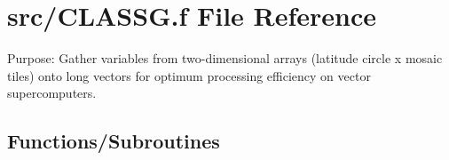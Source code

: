 \hypertarget{CLASSG_8f}{}\section{src/\+C\+L\+A\+S\+S\+G.f File Reference}
\label{CLASSG_8f}


Purpose\+: Gather variables from two-\/dimensional arrays (latitude circle x mosaic tiles) onto long vectors for optimum processing efficiency on vector supercomputers.  


\subsection*{Functions/\+Subroutines}
\begin{DoxyCompactItemize}
\item 

\end{DoxyCompactItemize}
